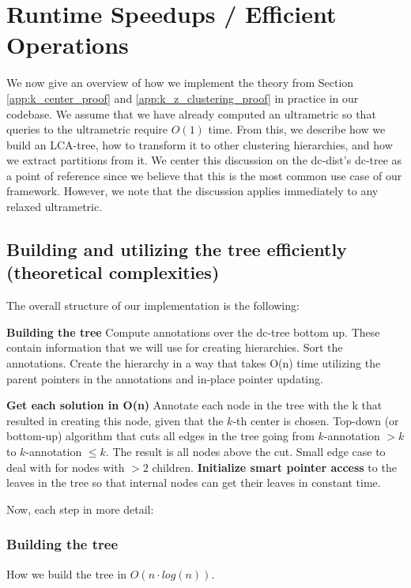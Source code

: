 \section{Runtime Speedups / Efficient Operations}


We now give an overview of how we implement the theory from Section \ref{app:k_center_proof} and \ref{app:k_z_clustering_proof} in practice in our codebase. We assume that we have already computed an ultrametric so that queries to the ultrametric require $O(1)$ time. From this, we describe how we build an LCA-tree, how to transform it to other clustering hierarchies, and how we extract partitions from it. We center this discussion on the dc-dist's dc-tree as a point of reference since we believe that this is the most common use case of our framework. However, we note that the discussion applies immediately to any relaxed ultrametric.

\subsection{Building and utilizing the tree efficiently (theoretical complexities)}
The overall structure of our implementation is the following:
\begin{outline}[enumerate]
    \1 \textbf{Building the tree}
        \2 Compute annotations over the dc-tree bottom up. These contain information that we will use for creating hierarchies.
        \2 Sort the annotations.
        \2 Create the hierarchy in a way that takes O(n) time utilizing the parent pointers in the annotations and in-place pointer updating. 
            
    \1 \textbf{Get each solution in O(n)}
        \2 Annotate each node in the tree with the k that resulted in creating this node, given that the $k$-th center is chosen.
        \2 Top-down (or bottom-up) algorithm that cuts all edges in the tree going from $k$-annotation $> k$ to $k$-annotation $\leq k$. The result is all nodes above the cut.
        \2 Small edge case to deal with for nodes with $> 2$ children.
    \1 \textbf{Initialize smart pointer access} to the leaves in the tree so that internal nodes can get their leaves in constant time.
\end{outline}
Now, each step in more detail:

\subsubsection{Building the tree}
How we build the tree in $O(n \cdot log(n))$.

